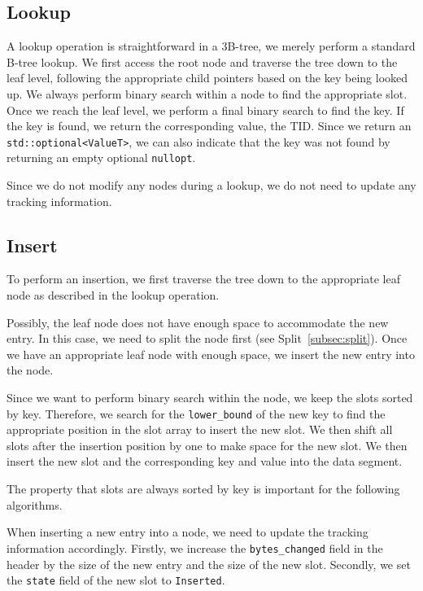 \subsection*{Lookup}
A lookup operation is straightforward in a 3B-tree, we merely perform a standard B-tree lookup.
We first access the root node and traverse the tree down to the leaf level, following the appropriate child pointers based on the key being looked up.
We always perform binary search within a node to find the appropriate slot. 
Once we reach the leaf level, we perform a final binary search to find the key.
If the key is found, we return the corresponding value, the \ac{TID}.
Since we return an \texttt{std::optional<ValueT>}, we can also indicate that the key was not found by returning an empty optional \texttt{nullopt}.

Since we do not modify any nodes during a lookup, we do not need to update any tracking information.

\subsection*{Insert}
To perform an insertion, we first traverse the tree down to the appropriate leaf node as described in the lookup operation.

Possibly, the leaf node does not have enough space to accommodate the new entry.
In this case, we need to split the node first (see Split~\ref{subsec:split}).
Once we have an appropriate leaf node with enough space, we insert the new entry into the node.

Since we want to perform binary search within the node, we keep the slots sorted by key.
Therefore, we search for the \texttt{lower\_bound} of the new key to find the appropriate position in the slot array to insert the new slot.
We then shift all slots after the insertion position by one to make space for the new slot.
We then insert the new slot and the corresponding key and value into the data segment.

The property that slots are always sorted by key is important for the following algorithms.

When inserting a new entry into a node, we need to update the tracking information accordingly.
Firstly, we increase the \texttt{bytes\_changed} field in the header by the size of the new entry and the size of the new slot.
Secondly, we set the \texttt{state} field of the new slot to \texttt{Inserted}.


